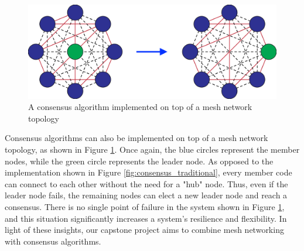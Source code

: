 \begin{figure}[H]
    \centering
    \includegraphics[width=0.5\columnwidth]{final-proposal/images/consensus_mesh.png}
    \caption{A consensus algorithm implemented on top of a mesh network topology}
    \label{fig:consensus_mesh}
\end{figure}

Consensus algorithms can also be implemented on top of a mesh network topology, as shown in Figure \ref{fig:consensus_mesh}. Once again, the blue circles represent the member nodes, while the green circle represents the leader node. As opposed to the implementation shown in Figure \ref{fig:consensus_traditional}, every member code can connect to each other without the need for a "hub" node. Thus, even if the leader node fails, the remaining nodes can elect a new leader node and reach a consensus. There is no single point of failure in the system shown in Figure \ref{fig:consensus_mesh}, and this situation significantly increases a system's resilience and flexibility. In light of these insights, our capstone project aims to combine mesh networking with consensus algorithms.